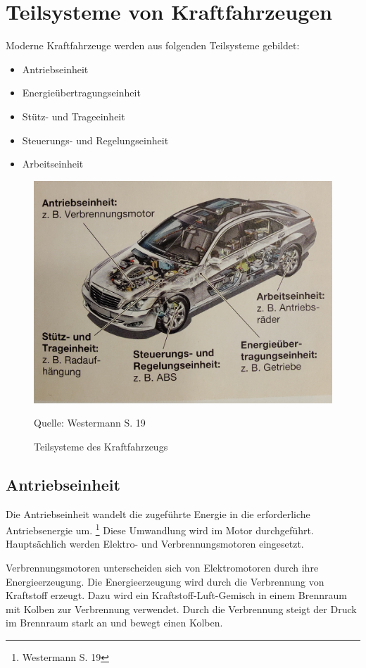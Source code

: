 \section{Teilsysteme von Kraftfahrzeugen}
Moderne Kraftfahrzeuge werden aus folgenden Teilsysteme gebildet:
\begin{itemize}
	\item Antriebseinheit
	\item Energieübertragungseinheit
	\item Stütz- und Trageeinheit
	\item Steuerungs- und Regelungseinheit
	\item Arbeitseinheit
\end{itemize}


\begin{figure}[h!]
	\caption{Teilsysteme des Kraftfahrzeugs}
	\includegraphics[scale=0.1]{assets/figures/Teilsysteme des Kraftfahrzeugs.jpg}
	\begin{flushleft}
		Quelle: Westermann S. 19
	\end{flushleft}
	\label{fig:birds}
\end{figure}


\subsection{Antriebseinheit}
Die Antriebseinheit wandelt die zugeführte Energie in die erforderliche Antriebsenergie um.
\footnote{Westermann S. 19}
Diese Umwandlung wird im Motor durchgeführt.
Hauptsächlich werden Elektro- und Verbrennungsmotoren eingesetzt.

Verbrennungsmotoren unterscheiden sich von Elektromotoren durch ihre Energieerzeugung.
Die Energieerzeugung wird durch die Verbrennung von Kraftstoff erzeugt.
Dazu wird ein Kraftstoff-Luft-Gemisch in einem Brennraum mit Kolben zur Verbrennung verwendet.
Durch die Verbrennung steigt der Druck im Brennraum stark an und bewegt einen Kolben.

